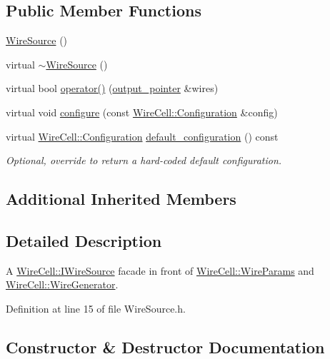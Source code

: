 \subsection*{Public Member Functions}
\begin{DoxyCompactItemize}
\item 
\hyperlink{class_wire_cell_1_1_wire_source_a7274bb11ca25ea2b0cf35aa201447a0e}{Wire\+Source} ()
\item 
virtual \hyperlink{class_wire_cell_1_1_wire_source_a4421c4beeeeb8bf1e1d2b9f2832a22ed}{$\sim$\+Wire\+Source} ()
\item 
virtual bool \hyperlink{class_wire_cell_1_1_wire_source_a0d8e39c5e5248cc34efa1d1655a0e52b}{operator()} (\hyperlink{class_wire_cell_1_1_i_source_node_ae2743237513016d7f69d68aac1104951}{output\+\_\+pointer} \&wires)
\item 
virtual void \hyperlink{class_wire_cell_1_1_wire_source_a7038c5f4c7c80fbfaaa1ad3581eaa088}{configure} (const \hyperlink{namespace_wire_cell_a9f705541fc1d46c608b3d32c182333ee}{Wire\+Cell\+::\+Configuration} \&config)
\item 
virtual \hyperlink{namespace_wire_cell_a9f705541fc1d46c608b3d32c182333ee}{Wire\+Cell\+::\+Configuration} \hyperlink{class_wire_cell_1_1_wire_source_ad691cb96dcbb5bca637640367d0ad759}{default\+\_\+configuration} () const
\begin{DoxyCompactList}\small\item\em Optional, override to return a hard-\/coded default configuration. \end{DoxyCompactList}\end{DoxyCompactItemize}
\subsection*{Additional Inherited Members}


\subsection{Detailed Description}
A \hyperlink{class_wire_cell_1_1_i_wire_source}{Wire\+Cell\+::\+I\+Wire\+Source} facade in front of \hyperlink{class_wire_cell_1_1_wire_params}{Wire\+Cell\+::\+Wire\+Params} and \hyperlink{class_wire_cell_1_1_wire_generator}{Wire\+Cell\+::\+Wire\+Generator}. 

Definition at line 15 of file Wire\+Source.\+h.



\subsection{Constructor \& Destructor Documentation}
\mbox{\label{class_wire_cell_1_1_wire_source_a7274bb11ca25ea2b0cf35aa201447a0e}} 
